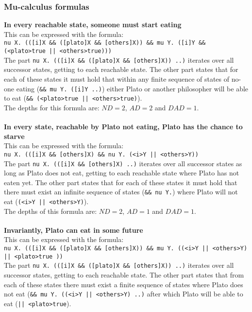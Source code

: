 \documentclass[10pt,a4paper]{article}
\begin{document}
\subsubsection{Mu-calculus formulas}
\textbf{In every reachable state, someone must start eating}\\
This can be expressed with the formula:\\
{\tt nu X. (([i]X \&\& ([plato]X \&\& [others]X)) \&\& mu Y. ([i]Y \&\& (<plato>true || <others>true)))}\\
The part {\tt nu X. (([i]X \&\& ([plato]X \&\& [others]X)) ..)} iterates over all successor states, getting to each reachable state. The other part states that for each of these states it must hold that within any finite sequence of states of no-one eating ({\tt \&\& mu Y. ([i]Y ..)}) either Plato or another philosopher will be able to eat ({\tt \&\& (<plato>true || <others>true)}).\\
The depths for this formula are: $ND = 2$, $AD = 2$ and $DAD = 1$.
\\\\
\textbf{In every state, reachable by Plato not eating, Plato has the chance to starve}\\
This can be expressed with the formula:\\
{\tt nu X. (([i]X \&\& [others]X) \&\& nu Y. (<i>Y || <others>Y))}\\
The part {\tt nu X. (([i]X \&\& [others]X) ..)} iterates over all successor states as long as Plato does not eat, getting to each reachable state where Plato has not eaten yet. The other part states that for each of these states it must hold that there must exist an infinite sequence of states ({\tt \&\& nu Y.}) where Plato will not eat ({\tt (<i>Y || <others>Y)}).\\
The depths of this formula are: $ND = 2$, $AD = 1$ and $DAD = 1$.
\\\\
\textbf{Invariantly, Plato can eat in some future}\\
This can be expressed with the formula:\\
{\tt nu X. (([i]X \&\& ([plato]X \&\& [others]X)) \&\& mu Y. ((<i>Y || <others>Y) || <plato>true ))}\\
The part {\tt nu X. (([i]X \&\& ([plato]X \&\& [others]X)) ..)} iterates over all successor states, getting to each reachable state. The other part states that from each of these states there must exist a finite sequence of states where Plato does not eat ({\tt \&\& mu Y. ((<i>Y || <others>Y) ..)} after which Plato will be able to eat ({\tt || <plato>true}).\\
\end{document}

